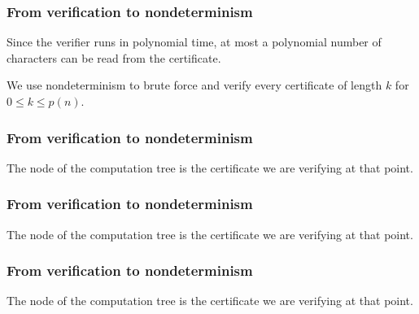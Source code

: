 \documentclass[aspectratio=169]{beamer}
\begin{document}
\begin{frame}
\frametitle{From verification to nondeterminism}
Since the verifier runs in polynomial time, at most a polynomial number of characters can be read from the certificate.

We use nondeterminism to brute force and verify every certificate of length $k$ for $0 \leq k \leq p(n)$.
\end{frame}

\begin{frame}
\frametitle{From verification to nondeterminism}

The node of the computation tree is the certificate we are verifying at that point.
\begin{center}
\end{center}
\end{frame}

\begin{frame}[noframenumbering]
\frametitle{From verification to nondeterminism}

The node of the computation tree is the certificate we are verifying at that point.
\begin{center}
\end{center}
\end{frame}

\begin{frame}[noframenumbering]
\frametitle{From verification to nondeterminism}

The node of the computation tree is the certificate we are verifying at that point.
\begin{center}
\end{center}
\end{frame}
\end{document}
